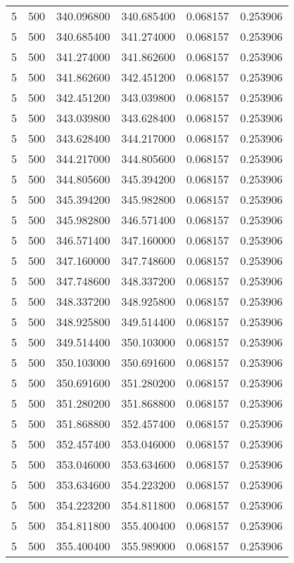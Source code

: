 \begin{longtable}{rrrrrr}
5 & 500 & 340.096800 & 340.685400 & 0.068157 & 0.253906 \\
5 & 500 & 340.685400 & 341.274000 & 0.068157 & 0.253906 \\
5 & 500 & 341.274000 & 341.862600 & 0.068157 & 0.253906 \\
5 & 500 & 341.862600 & 342.451200 & 0.068157 & 0.253906 \\
5 & 500 & 342.451200 & 343.039800 & 0.068157 & 0.253906 \\
5 & 500 & 343.039800 & 343.628400 & 0.068157 & 0.253906 \\
5 & 500 & 343.628400 & 344.217000 & 0.068157 & 0.253906 \\
5 & 500 & 344.217000 & 344.805600 & 0.068157 & 0.253906 \\
5 & 500 & 344.805600 & 345.394200 & 0.068157 & 0.253906 \\
5 & 500 & 345.394200 & 345.982800 & 0.068157 & 0.253906 \\
5 & 500 & 345.982800 & 346.571400 & 0.068157 & 0.253906 \\
5 & 500 & 346.571400 & 347.160000 & 0.068157 & 0.253906 \\
5 & 500 & 347.160000 & 347.748600 & 0.068157 & 0.253906 \\
5 & 500 & 347.748600 & 348.337200 & 0.068157 & 0.253906 \\
5 & 500 & 348.337200 & 348.925800 & 0.068157 & 0.253906 \\
5 & 500 & 348.925800 & 349.514400 & 0.068157 & 0.253906 \\
5 & 500 & 349.514400 & 350.103000 & 0.068157 & 0.253906 \\
5 & 500 & 350.103000 & 350.691600 & 0.068157 & 0.253906 \\
5 & 500 & 350.691600 & 351.280200 & 0.068157 & 0.253906 \\
5 & 500 & 351.280200 & 351.868800 & 0.068157 & 0.253906 \\
5 & 500 & 351.868800 & 352.457400 & 0.068157 & 0.253906 \\
5 & 500 & 352.457400 & 353.046000 & 0.068157 & 0.253906 \\
5 & 500 & 353.046000 & 353.634600 & 0.068157 & 0.253906 \\
5 & 500 & 353.634600 & 354.223200 & 0.068157 & 0.253906 \\
5 & 500 & 354.223200 & 354.811800 & 0.068157 & 0.253906 \\
5 & 500 & 354.811800 & 355.400400 & 0.068157 & 0.253906 \\
5 & 500 & 355.400400 & 355.989000 & 0.068157 & 0.253906 \\

\end{longtable}
